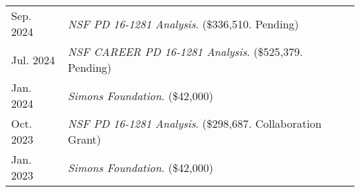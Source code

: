 
    \medskip


    \medskip
    
    \begin{center}
    {
    \renewcommand{\arraystretch}{1.5}
    \begin{longtable}{p{}  p{}}
     Sep.  2024 & \textit{NSF PD 16-1281 Analysis}. (\$336,510. Pending) \\ 
 Jul.  2024 & \textit{NSF CAREER PD 16-1281 Analysis}. (\$525,379. Pending) \\ 
 Jan.  2024 & \textit{Simons Foundation}. (\$42,000) \\ 
 Oct.  2023 & \textit{NSF PD 16-1281 Analysis}. (\$298,687. Collaboration Grant) \\ 
 Jan.  2023 & \textit{Simons Foundation}. (\$42,000) 
    \end{longtable}
    } 
    \end{center}

    \vspace{-1em}
    